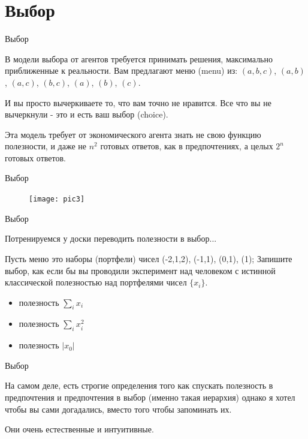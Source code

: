 \documentclass{beamer}
\begin{document}
\section{Выбор}

\begin{frame}{Выбор}

В модели выбора от агентов требуется принимать решения, максимально приближенные к реальности. Вам предлагают меню (\alert{menu}) из: $(a,b,c)$, $(a,b)$, $(a,c)$, $(b,c)$, $(a)$, $(b)$, $(c)$.

И вы просто вычеркиваете то, что вам точно не нравится. Все что вы не вычеркнули - это и есть ваш выбор (\alert{choice}). 

Эта модель требует от экономического агента знать не свою функцию полезности, и даже не $n^2$ готовых ответов, как в предпочтениях, а целых $2^n$ готовых ответов.

\end{frame}

\begin{frame}{Выбор}

\begin{figure}[hbt]
\centering
\texttt{[image: pic3]}
\end{figure}

\end{frame}

\begin{frame}{Выбор}

Потренируемся у доски переводить полезности в выбор...

Пусть меню это наборы (портфели) чисел (-2,1,2), (-1,1), (0,1), (1); Запишите выбор, как если бы вы проводили эксперимент над человеком с истинной классической полезностью над портфелями чисел $\{x_i\}$.

\begin{itemize}
\item полезность $\sum_i x_i$
\item полезность $\sum_i x_i^2$
\item полезность $|x_0|$
\end{itemize}

\end{frame}

\begin{frame}{Выбор}

На самом деле, есть строгие определения того как спускать полезность в предпочтения и предпочтения в выбор (именно такая иерархия) однако я хотел чтобы вы сами догадались, вместо того чтобы запоминать их.

Они очень естественные и интуитивные.
\end{frame}
\end{document}
